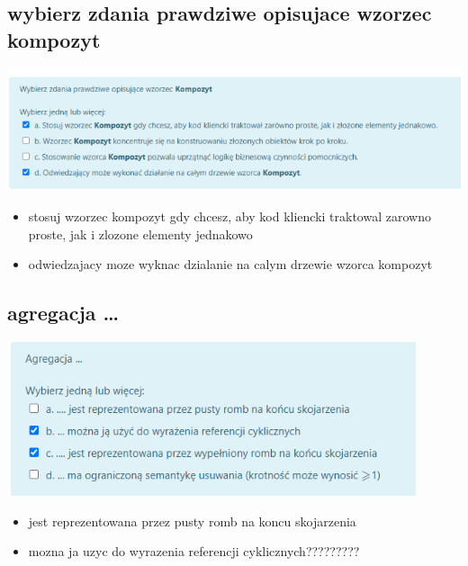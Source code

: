 \documentclass[11pt]{article}
\begin{document}
\subsection{wybierz zdania prawdziwe opisujace wzorzec kompozyt}
\label{sec:orgef0736c}
\begin{center}
\includegraphics[width=.9\linewidth]{./zadanie8.png}
\end{center}
\begin{itemize}
\item stosuj wzorzec kompozyt gdy chcesz, aby kod kliencki traktowal zarowno proste, jak i zlozone elementy jednakowo
\item odwiedzajacy moze wyknac dzialanie na calym drzewie wzorca kompozyt
\end{itemize}
\subsection{agregacja \ldots{}}
\label{sec:org66cfb9a}
\begin{center}
\includegraphics[width=.9\linewidth]{./zadanie9.png}
\end{center}
\begin{itemize}
\item jest reprezentowana przez pusty romb na koncu skojarzenia
\item mozna ja uzyc do wyrazenia referencji cyklicznych?????????
\end{itemize}
\end{document}
